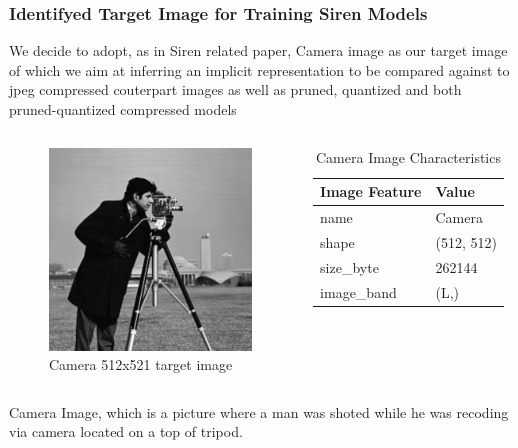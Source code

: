\begin{frame}
    \frametitle{Identifyed Target Image for Training Siren Models}
        We decide to adopt, as in Siren related paper, Camera image as our target image of which we aim at inferring an implicit representation to be
        compared against to jpeg compressed couterpart images as well as pruned, quantized and both pruned-quantized compressed models


        \begin{columns}
            \begin{figure}
            \includegraphics[scale=0.2]{slides/experiments/target-image/images/cameramen_512x512.png}
            \caption{Camera 512x521 target image}
            \end{figure}

            \begin{table}
            \begin{tabular}{ll}
            \hline
                    Image Feature & Value \\
            \hline
                name &      Camera \\
                shape &  (512, 512) \\
            size\_byte &      262144 \\
            image\_band &        (L,) \\
            \hline
            \end{tabular}
            \caption{Camera Image Characteristics }
            \end{table}

            \end{columns}
            Camera Image, which is a picture where a man was shoted while he was recoding via camera located on a top of tripod.
\end{frame}
